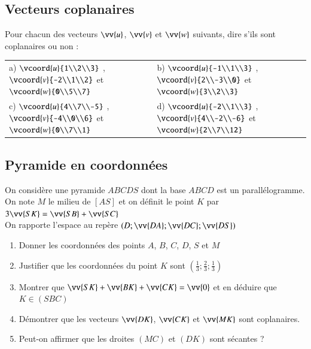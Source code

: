 \documentclass[oneside,12pt]{article}          %
\begin{document}
    
\subsection{Vecteurs coplanaires}
Pour chacun des vecteurs $\vv{u}$, $\vv{v}$ et $\vv{w}$ suivants, dire s'ils sont coplanaires ou non :

\begin{tabular}{p{} p{}}
    a) $\vcoord{u}{1\\2\\3}$ , $\vcoord{v}{-2\\1\\2}$ et $\vcoord{w}{0\\5\\7}$ &
    b) $\vcoord{u}{-1\\1\\3}$ , $\vcoord{v}{2\\-3\\0}$ et $\vcoord{w}{3\\2\\3}$ \\[20pt]
    c) $\vcoord{u}{4\\7\\-5}$ , $\vcoord{v}{-4\\0\\6}$ et $\vcoord{w}{0\\7\\1}$ &
    d) $\vcoord{u}{-2\\1\\3}$ , $\vcoord{v}{4\\-2\\-6}$ et $\vcoord{w}{2\\7\\12}$ \\
\end{tabular}



\subsection{Pyramide en coordonnées}
On considère une pyramide $ABCDS$ dont la base $ABCD$ est un parallélogramme. On note $M$ le milieu de $[AS]$ et on définit le point $K$ par $3\vv{SK}=\vv{SB}+\vv{SC}$\\
On rapporte l'espace au repère $(D;\vv{DA};\vv{DC};\vv{DS})$
\begin{enumerate}
	\item Donner les coordonnées des points $A$, $B$, $C$, $D$, $S$ et $M$
	\item Justifier que les coordonnées du point $K$ sont $\left(\frac{1}{3};\frac{2}{3};\frac{1}{3}\right)$
	\item Montrer que $\vv{SK}+\vv{BK}+\vv{CK}=\vv{0}$ et en déduire que $K\in(SBC)$
	\item Démontrer que les vecteurs $\vv{DK}$, $\vv{CK}$ et $\vv{MK}$ sont coplanaires.
	\item Peut-on affirmer que les droites $(MC)$  et $(DK)$ sont sécantes ?
\end{enumerate}
\end{document}
